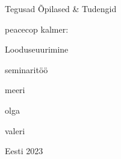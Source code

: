 \begin{titlepage}
\par{Tegusad Õpilased \& Tudengid}
\vspace{0.3\textheight}
\par{peacecop kalmer:}
\LARGE
\par{Looduseuurimine}
\normalsize
\par{seminaritöö}
\vspace{0.3\textheight}
\begin{flushright}
\par{meeri}
\par{olga}
\par{valeri}
\end{flushright}
\vfill
Eesti
\hfill
2023
\end{titlepage}

